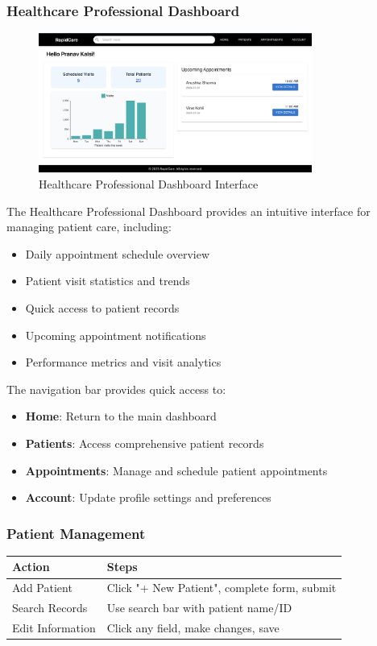 \documentclass[12pt, titlepage]{article}
\begin{document}
\subsubsection{Healthcare Professional Dashboard}
\begin{figure}[H]
\centering
\includegraphics[width=0.8\textwidth]{healthcare.png}
\caption{Healthcare Professional Dashboard Interface}
\label{fig:healthcare_dashboard}
\end{figure}

The Healthcare Professional Dashboard provides an intuitive interface for managing patient care, including:
\begin{itemize}
\item Daily appointment schedule overview
\item Patient visit statistics and trends
\item Quick access to patient records
\item Upcoming appointment notifications
\item Performance metrics and visit analytics
\end{itemize}

The navigation bar provides quick access to:
\begin{itemize}
\item \textbf{Home}: Return to the main dashboard
\item \textbf{Patients}: Access comprehensive patient records
\item \textbf{Appointments}: Manage and schedule patient appointments
\item \textbf{Account}: Update profile settings and preferences
\end{itemize}

\subsubsection{Patient Management}
\begin{longtable}{p{}p{}}
\toprule
\textbf{Action} & \textbf{Steps} \\
\midrule
Add Patient & Click "+ New Patient", complete form, submit \\
Search Records & Use search bar with patient name/ID \\
Edit Information & Click any field, make changes, save \\
\bottomrule
\end{longtable}
\end{document}
